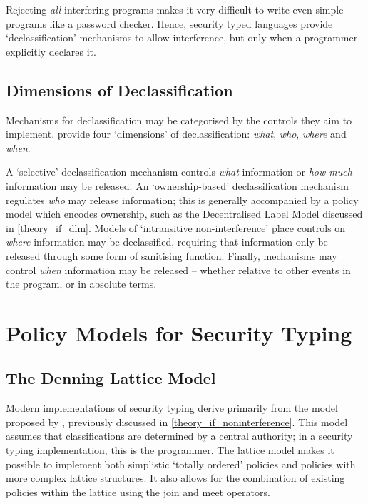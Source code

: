 Rejecting \textit{all} interfering programs makes it very difficult to write even simple programs like a password checker. Hence, security typed languages provide `declassification' mechanisms to allow interference, but only when a programmer explicitly declares it.

\subsection{Dimensions of Declassification}

Mechanisms for declassification may be categorised by the controls they aim to implement. \citeauthor{sabelfeld2005dimensions} \cite{sabelfeld2005dimensions} provide four `dimensions' of declassification: \textit{what}, \textit{who}, \textit{where} and \textit{when}.

A `selective' declassification mechanism controls \textit{what} information or \textit{how much} information may be released. An `ownership-based' declassification mechanism regulates \textit{who} may release information; this is generally accompanied by a policy model which encodes ownership, such as the Decentralised Label Model discussed in \ref{theory_if_dlm}. Models of `intransitive non-interference' \cite{roscoe1999intransitive} place controls on \textit{where} information may be declassified, requiring that information only be released through some form of sanitising function. Finally, mechanisms may control \textit{when} information may be released -- whether relative to other events in the program, or in absolute terms.

\section{Policy Models for Security Typing}

\subsection{The Denning Lattice Model}

Modern implementations of security typing derive primarily from the model proposed by \citeauthor{denning1977certification} \cite{denning1977certification}, previously discussed in \ref{theory_if_noninterference}. This model assumes that classifications are determined by a central authority; in a security typing implementation, this is the programmer. The lattice model makes it possible to implement both simplistic `totally ordered' policies and policies with more complex lattice structures. It also allows for the combination of existing policies within the lattice using the join and meet operators.

